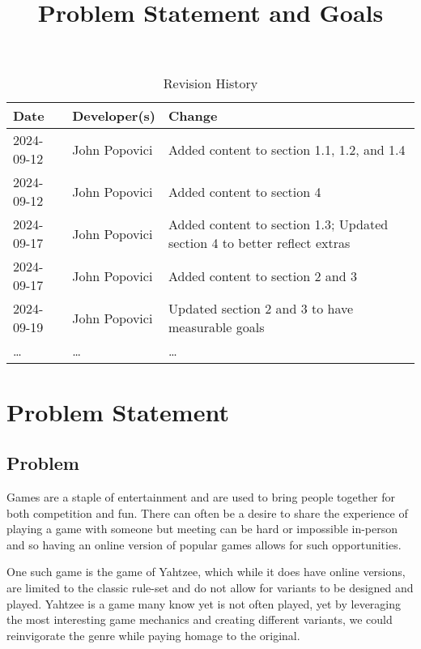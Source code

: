 \documentclass{article}
\title{Problem Statement and Goals\\\progname}
\author{\authname}
\date{}
\begin{document}
\maketitle

\begin{table}[hp]
\caption{Revision History} \label{TblRevisionHistory}
\begin{tabularx}{\textwidth}{llX}
\toprule
\textbf{Date} & \textbf{Developer(s)} & \textbf{Change}\\
\midrule
2024-09-12 & John Popovici & Added content to section 1.1, 1.2, and 1.4\\
2024-09-12 & John Popovici & Added content to section 4\\
2024-09-17 & John Popovici & Added content to section 1.3; Updated section 4 to better reflect extras\\
2024-09-17 & John Popovici & Added content to section 2 and 3\\
2024-09-19 & John Popovici & Updated section 2 and 3 to have measurable goals\\
\dots & \dots & \dots\\
\bottomrule
\end{tabularx}
\end{table}

\newpage
\section{Problem Statement}


\subsection{Problem}

Games are a staple of entertainment and are used to bring people together for both competition and fun.
There can often be a desire to share the experience of playing a game with someone but meeting can be hard or impossible in-person and so having an online version of popular games allows for such opportunities.

One such game is the game of Yahtzee, which while it does have online versions, are limited to the classic rule-set and do not allow for variants to be designed and played.
Yahtzee is a game many know yet is not often played, yet by leveraging the most interesting game mechanics and creating different variants, we could reinvigorate the genre while paying homage to the original.
\end{document}
